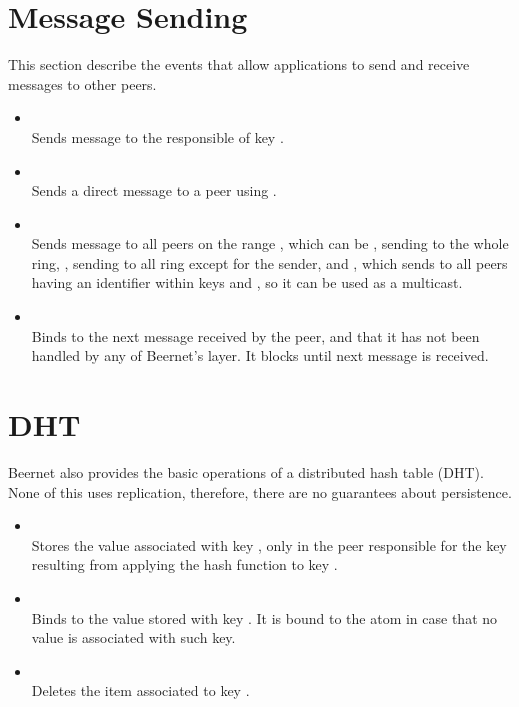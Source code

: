 \section{Message Sending}

This section describe the events that allow applications to send and receive
messages to other peers.

\begin{itemize}

\item {}\\ Sends message  to the responsible of
key .
 
\item {}\\ Sends a direct message  to a
peer using .
 
\item {}\\ Sends message  to all
peers on the range , which can be , sending to the whole
ring, , sending to all ring except for the sender, and
, which sends to all peers having an identifier within keys
 and , so it can be used as a multicast.

\item {}\\ Binds  to the next message received by
the peer, and that it has not been handled by any of Beernet's layer. It
blocks until next message is received. 

\end{itemize}

\section{DHT}

Beernet also provides the basic operations of a distributed hash table (DHT).
None of this uses replication, therefore, there are no guarantees about
persistence.

\begin{itemize}

\item {}\\ Stores the value  associated with key
, only in the peer responsible for the key resulting from applying
the hash function to key .

\item {}\\ Binds  to the value stored with key
. It is bound to the atom  in case that no value
is associated with such key.

\item {}\\ Deletes the item associated to key .

\end{itemize}

